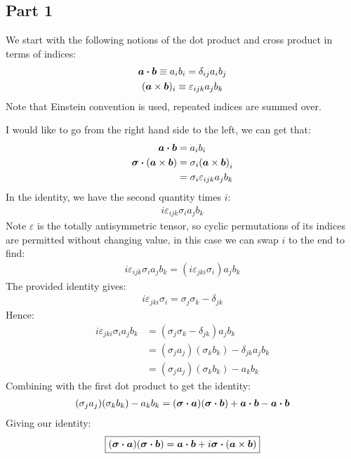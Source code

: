 \documentclass[12pt]{article}
\renewcommand{\vb}[1]{\bm{#1}}
\begin{document}
\subsection*{Part 1}
We start with the following notions of the dot product and cross product in terms of indices:
\begin{gather*}
  \vb{a}\vdot\vb{b}\equiv a_ib_i=\delta_{ij}a_ib_j\\
  (\vb{a}\times\vb{b})_i\equiv\varepsilon_{ijk}a_jb_k
\end{gather*}
Note that Einstein convention is used, repeated indices are summed over.

I would like to go from the right hand side to the left, we can get that:
\begin{align*}
  \vb{a}\vdot\vb{b}&=a_ib_i\\
  \vb{\sigma}\vdot(\vb{a}\times\vb{b})&=\sigma_i\qty(\vb{a}\times\vb{b})_i\\
  &=\sigma_i\varepsilon_{ijk}a_jb_k
\end{align*}
In the identity, we have the second quantity times $i$:
\begin{align*}
  i\varepsilon_{ijk}\sigma_ia_jb_k
\end{align*}
Note $\varepsilon$ is the totally antisymmetric tensor, so cyclic permutations of its indices are permitted without changing value, in this case we can swap $i$ to the end to find:
\begin{align*}
  i\varepsilon_{ijk}\sigma_ia_jb_k=(i\varepsilon_{jki}\sigma_i)a_jb_k
\end{align*}
The provided identity gives:
\begin{align*}
  i\varepsilon_{jki}\sigma_i=\sigma_j\sigma_k-\delta_{jk}
\end{align*}
Hence:
\begin{align*}
  i\varepsilon_{jki}\sigma_ia_jb_k&=(\sigma_j\sigma_k-\delta_{jk})a_jb_k\\
  &=(\sigma_ja_j)(\sigma_kb_k)-\delta_{jk}a_jb_k\\
  &=(\sigma_ja_j)(\sigma_kb_k)-a_kb_k
\end{align*}
Combining with the first dot product to get the identity:
\begin{align*}
  (\sigma_ja_j)(\sigma_kb_k)-a_kb_k=
  (\vb{\sigma}\vdot\vb{a})(\vb{\sigma}\vdot\vb{b})
  +\vb{a}\vdot\vb{b}-\vb{a}\vdot\vb{b}
\end{align*}
Giving our identity:
\begin{align}
  \boxed{
    (\vb{\sigma}\vdot\vb{a})(\vb{\sigma}\vdot\vb{b})=
    \vb{a}\vdot\vb{b}+i\vb{\sigma}\vdot(\vb{a}\times\vb{b})
  }
\end{align}
\end{document}
